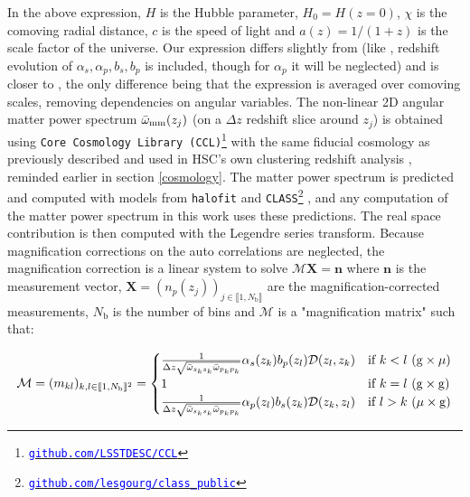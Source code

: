 In the above expression, $H$ is the Hubble parameter, $H_0=H(z=0)$, $\chi$ is the comoving radial distance, $c$ is the speed of light and $a(z)=1/(1+z)$ is the scale factor of the universe. Our expression differs slightly from \cite{Cawthon2022DESY3Boss} (like \cite{EuclidClusterRedshifts2025}, redshift evolution of $\alpha_s,\alpha_p,b_s,b_p$ is included, though for $\alpha_p$ it will be neglected) and is closer to \cite{EuclidClusterRedshifts2025}, the only difference being that the expression is averaged over comoving scales, removing dependencies on angular variables. The non-linear 2D angular matter power spectrum $\bar{\omega}_{\mathrm{mm}}(z_j)$ (on a $\Delta z$ redshift slice around $z_j$) is obtained using \texttt{Core Cosmology Library (CCL)}\footnote{\href{https://github.com/LSSTDESC/CCL}{\textcolor{blue}{\texttt{github.com/LSSTDESC/CCL}}}} \cite{CCLChisari2019} with the same fiducial cosmology as previously described and used in HSC's own clustering redshift analysis \cite{HSCClusteringRau2023}, reminded earlier in section \ref{cosmology}. The matter power spectrum is predicted and computed with models from \texttt{halofit} \cite{HalofitTakahashi2012} and \texttt{CLASS}\footnote{\href{https://github.com/lesgourg/class_public}{\textcolor{blue}{\texttt{github.com/lesgourg/class\_public}}}} \cite{CLASSBlas2011}, and any computation of the matter power spectrum in this work uses these predictions. The real space contribution is then computed with the Legendre series transform. Because magnification corrections on the auto correlations are neglected, the magnification correction is a linear system to solve $\mathcal{M}\mathbf{X}=\mathbf{n}$ where $\mathbf{n}$ is the measurement vector, $\mathbf{X}=(n_p(z_j))_{j\in\llbracket1,N_{\mathrm{b}}\rrbracket}$ are the magnification-corrected measurements, $N_\mathrm{b}$ is the number of bins and $\mathcal{M}$ is a "magnification matrix" such that:

\begin{equation}
    \mathcal{M}=(m_{kl})_{k,l\in\llbracket1,N_{\mathrm{b}}\rrbracket^2}=
    \begin{cases}
\frac{1}{\Delta z\sqrt{\bar{\omega}_{s_ks_k}\bar{\omega}_{p_kp_k}}}\alpha_s(z_k)b_p(z_l)\mathcal{D}(z_l,z_k) & \text{if } k < l \text{ ($\mathrm{g}\times\mu $)}\\
1 & \text{if } k = l \text{ ($\mathrm{g}\times \mathrm{g} $)}\\
\frac{1}{\Delta z\sqrt{\bar{\omega}_{s_ks_k}\bar{\omega}_{p_kp_k}}}\alpha_p(z_l)b_s(z_k)\mathcal{D}(z_k,z_l) & \text{if } l > k \text{ ($\mu\times \mathrm{g} $)}
    \end{cases}\label{eq:mag_matrix}
\end{equation}

